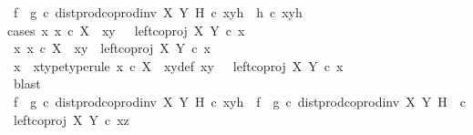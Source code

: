 \begin{isabellebody}
\ {\isachardoublequoteopen}{\isacharparenleft}{\kern0pt}f\isactrlsup {\isasymflat}\ {\isasymamalg}\ g\isactrlsup {\isasymflat}\ {\isasymcirc}\isactrlsub c\ dist{\isacharunderscore}{\kern0pt}prod{\isacharunderscore}{\kern0pt}coprod{\isacharunderscore}{\kern0pt}inv{}\ X\ Y\ H{\isacharparenright}{\kern0pt}\ {\isasymcirc}\isactrlsub c\ xyh\ {\isacharequal}{\kern0pt}\ h\isactrlsup {\isasymflat}\ {\isasymcirc}\isactrlsub c\ xyh{\isachardoublequoteclose}\isanewline
\ \ \ \ \ \ \ \ \ \ \isamarkupfalse%
{\isacharparenleft}{\kern0pt}cases\ {\isachardoublequoteopen}{\isasymexists}x{\isachardot}{\kern0pt}\ x\ {\isasymin}\isactrlsub c\ X\ {\isasymand}\ xy\ {\isacharequal}{\kern0pt}\ \ left{\isacharunderscore}{\kern0pt}coproj\ X\ Y\ {\isasymcirc}\isactrlsub c\ x{\isachardoublequoteclose}{\isacharparenright}{\kern0pt}\isanewline
\ \ \ \ \ \ \ \ \ \ \ \ \isamarkupfalse%
\ {\isachardoublequoteopen}{\isasymexists}x{\isachardot}{\kern0pt}\ x\ {\isasymin}\isactrlsub c\ X\ {\isasymand}\ xy\ {\isacharequal}{\kern0pt}\ left{\isacharunderscore}{\kern0pt}coproj\ X\ Y\ {\isasymcirc}\isactrlsub c\ x{\isachardoublequoteclose}\isanewline
\ \ \ \ \ \ \ \ \ \ \ \ \isamarkupfalse%
\ \isamarkupfalse%
\ x\ \ x{\isacharunderscore}{\kern0pt}type{\isacharbrackleft}{\kern0pt}type{\isacharunderscore}{\kern0pt}rule{\isacharbrackright}{\kern0pt}{\isacharcolon}{\kern0pt}\ {\isachardoublequoteopen}x\ {\isasymin}\isactrlsub c\ X{\isachardoublequoteclose}\ \ xy{\isacharunderscore}{\kern0pt}def{\isacharcolon}{\kern0pt}\ {\isachardoublequoteopen}xy\ {\isacharequal}{\kern0pt}\ \ left{\isacharunderscore}{\kern0pt}coproj\ X\ Y\ {\isasymcirc}\isactrlsub c\ x{\isachardoublequoteclose}\isanewline
\ \ \ \ \ \ \ \ \ \ \ \ \ \ \isamarkupfalse%
\ blast\isanewline
\ \ \ \ \ \ \ \ \ \ \ \ \isamarkupfalse%
\ {\isachardoublequoteopen}{\isacharparenleft}{\kern0pt}f\isactrlsup {\isasymflat}\ {\isasymamalg}\ g\isactrlsup {\isasymflat}\ {\isasymcirc}\isactrlsub c\ dist{\isacharunderscore}{\kern0pt}prod{\isacharunderscore}{\kern0pt}coprod{\isacharunderscore}{\kern0pt}inv{}\ X\ Y\ H{\isacharparenright}{\kern0pt}\ {\isasymcirc}\isactrlsub c\ xyh\ {\isacharequal}{\kern0pt}\ {\isacharparenleft}{\kern0pt}f\isactrlsup {\isasymflat}\ {\isasymamalg}\ g\isactrlsup {\isasymflat}{\isacharparenright}{\kern0pt}\ {\isasymcirc}\isactrlsub c\ {\isacharparenleft}{\kern0pt}dist{\isacharunderscore}{\kern0pt}prod{\isacharunderscore}{\kern0pt}coprod{\isacharunderscore}{\kern0pt}inv{}\ X\ Y\ H\ \ {\isasymcirc}\isactrlsub c\ {\isasymlangle}left{\isacharunderscore}{\kern0pt}coproj\ X\ Y\ {\isasymcirc}\isactrlsub c\ x{\isacharcomma}{\kern0pt}z{\isasymrangle}{\isacharparenright}{\kern0pt}{\isachardoublequoteclose}\isanewline

\end{isabellebody}
